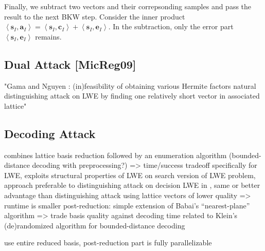 {Finally, we subtract two vectors and their correpsonding samples and pass the result to the next BKW step. Consider the inner product$\left\langle \mathbf{s}_{I}, \mathbf{a}_{I} \right\rangle = \left\langle \mathbf{s}_{I}, \mathbf{c}_{I} \right\rangle + \left\langle \mathbf{s}_{I}, \mathbf{e}_{I} \right\rangle$. In the subtraction, only the error part $\left\langle \mathbf{s}_{I}, \mathbf{e}_{I} \right\rangle$ remains. 




\subsection{Dual Attack [MicReg09]}
"Gama and Nguyen \cite{GN08b}: (in)feasibility of obtaining various Hermite factors
natural distinguishing attack on LWE by finding one relatively short vector in associated lattice"

\subsection{Decoding Attack \cite{LP11}} \label{sec:decoding}

combines lattice basis reduction followed by an enumeration algorithm (bounded-distance decoding with preprocessing?) => time/success tradeoff
specifically for LWE, exploits structural properties of LWE
on search version of LWE problem, approach preferable to distinguishing attack on decision LWE in \cite{MR09, RS10}, same or better advantage than distinguishing attack using lattice vectors of lower quality => runtime is smaller
post-reduction: simple extension of Babai's ``nearest-plane'' algorithm \cite{Bab85} %
=> trade basis quality against decoding time
related to Klein's (de)randomized algorithm \cite{Kle00} for bounded-distance decoding

use entire reduced basis, post-reduction part is fully parallelizable



}
